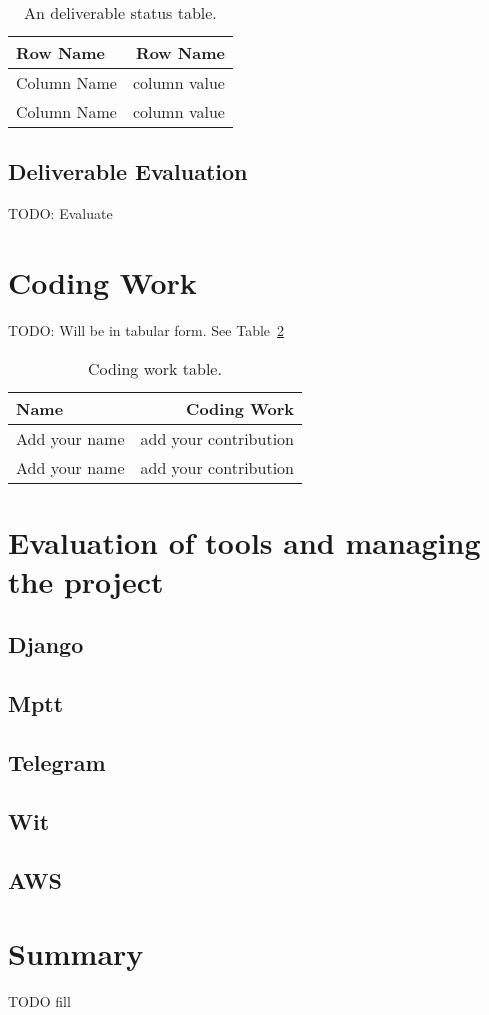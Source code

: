 \documentclass[a4paper]{article}
\begin{document}
\begin{table}
\centering
\begin{tabular}{l|r}
Row Name & Row Name \\\hline
Column Name & column value \\
Column Name & column value
\end{tabular}
\caption{\label{tab:deliverablestatus}An deliverable status table.}
\end{table}

\subsection{Deliverable Evaluation}
TODO: Evaluate

\section{Coding Work}
TODO: Will be in tabular form. See Table~\ref{tab:codingwork}

\begin{table}
\centering
\begin{tabular}{l|r}
Name & Coding Work \\\hline
Add your name & add your contribution \\
Add your name & add your contribution
\end{tabular}
\caption{\label{tab:codingwork}Coding work table.}
\end{table}

\section{Evaluation of tools and managing the project}
\subsection{Django}
\subsection{Mptt}
\subsection{Telegram}
\subsection{Wit}
\subsection{AWS}

\section{Summary}
TODO fill
\end{document}
